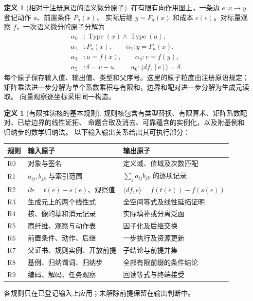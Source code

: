 \documentclass[12pt,a4paper,openany,notitlepage]{report}
\theoremstyle{plain}
\theoremstyle{definition}
\newtheorem{definition}[theorem]{定义}
\theoremstyle{remark}
\begin{document}
\begin{CJK*}{UTF8}{gkai}
\begin{definition}[相对于注册原语的语义微分原子]
\label{hgov:def:atom}
在有限有向作用图上，一条边 $e:x\to y$ 登记动作 $a$、前置条件 $P_a(x)$、
实际后继 $y=F_a(x)$ 和成本 $c(e)$。对标量观察 $f$，一次语义微分的原子分解为
\[
\begin{aligned}
\alpha_0&:\operatorname{Type}(x)\land\operatorname{Type}(a),\\
\alpha_1&:P_a(x),\qquad
\alpha_2:y=F_a(x),\\
\alpha_3&:u=f(x),\qquad
\alpha_4:v=f(y),\\
\alpha_5&:\delta=v-u,\qquad
\alpha_6:\langle df,[e]\rangle=\delta .
\end{aligned}
\]
每个原子保存输入值、输出值、类型和父序号。这里的原子粒度由注册原语规定；
矩阵乘法进一步分解为单个系数乘积与有限和，边界和配对进一步分解为生成元读取。
向量观察逐坐标采用同一构造。
\end{definition}

\begin{definition}[有限推演核的基本规则]
\label{hgov:def:kernel}
规则核包含有类型替换、有限算术、矩阵系数配对、已给边界的线性延拓、
命题合取及消去、可靠蕴含的实例化，以及附基例和归纳步的数学归纳法。
以下输入输出关系给出其可执行部分：
\begin{center}\small
\begin{tabularx}{\textwidth}{P{.12\textwidth}YY}
\toprule
规则 & 输入原子 & 输出原子\\
\midrule
R0 & 对象与签名 & 定义域、值域及次数匹配\\
R1 & $a_{ij},b_{jk}$ 与索引范围 & $\sum_j a_{ij}b_{jk}$ 的逐项记录\\
R2 & $\partial e=t(e)-s(e)$、观察值 & $\langle df,e\rangle=f(t(e))-f(s(e))$\\
R3 & 生成元上的两个线性式 & 全空间等式及线性延拓证明\\
R4 & 核、像的基和消元记录 & 实际填补或分离泛函\\
R5 & 商纤维、观察与动作表 & 因子化及后继交换\\
R6 & 前置条件、动作、后继 & 一步执行及资源更新\\
R7 & 父证书、规则实例、开放前提 & 子结论与前提并集\\
R8 & 基例、归纳谓词、归纳步 & 全部有限前缀的条件结论\\
R9 & 编码、解码、任务观察 & 回读等式与终端接受\\
\bottomrule
\end{tabularx}
\end{center}
各规则只在已登记输入上应用；未解除前提保留在输出判断中。
\end{definition}


\end{CJK*}
\end{document}
